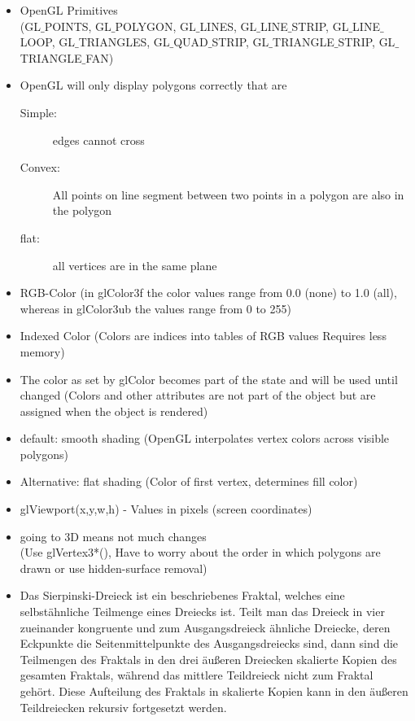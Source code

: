 \documentclass[11pt,a4paper]{article}
\begin{document}
\begin{itemize}
			\item OpenGL Primitives\\
			(GL$\_$POINTS,
			GL$\_$POLYGON,
			GL$\_$LINES,
			GL$\_$LINE$\_$STRIP,
			GL$\_$LINE$\_$LOOP,
			GL$\_$TRIANGLES,
			GL$\_$QUAD$\_$STRIP,
			GL$\_$TRIANGLE$\_$STRIP,
			GL$\_$TRIANGLE$\_$FAN)
			\item OpenGL will only display polygons correctly that are	
				\begin{description}
					\item[Simple:] edges cannot cross
					\item[Convex:] All points on line segment between two points in a polygon are also in the polygon	
					\item[flat:] all vertices are in the same plane
				\end{description}
			\item RGB-Color (in glColor3f the color values range from 0.0 (none) to 1.0 (all), whereas in glColor3ub the values range from 0 to 255)
			\item Indexed Color (Colors are indices into tables of RGB values Requires less memory)
			\item The color as set by glColor becomes part of the state and will be used until changed (Colors and other attributes are not part of the object but are assigned when the object is rendered)
			\item default: smooth shading (OpenGL interpolates vertex colors across visible polygons)
			\item Alternative: flat shading (Color of first vertex, determines fill color)
			\item glViewport(x,y,w,h) - Values in pixels (screen coordinates)
			\item going to 3D means not much changes\\
			(Use glVertex3*(), Have to worry about the order in which polygons are drawn or use hidden-surface removal)
			\item Das Sierpinski-Dreieck ist ein beschriebenes Fraktal, welches eine selbstähnliche Teilmenge eines Dreiecks ist. Teilt man das Dreieck in vier zueinander kongruente und zum Ausgangsdreieck ähnliche Dreiecke, deren Eckpunkte die Seitenmittelpunkte des Ausgangsdreiecks sind, dann sind die Teilmengen des Fraktals in den drei äußeren Dreiecken skalierte Kopien des gesamten Fraktals, während das mittlere Teildreieck nicht zum Fraktal gehört. Diese Aufteilung des Fraktals in skalierte Kopien kann in den äußeren Teildreiecken rekursiv fortgesetzt werden. 

\end{itemize}
\end{document}
